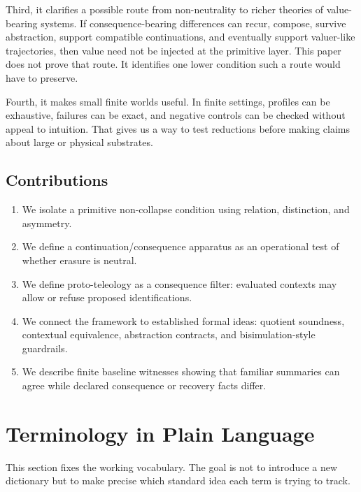 \documentclass[11pt]{article}
\begin{document}
Third, it clarifies a possible route from non-neutrality to richer theories of
value-bearing systems. If consequence-bearing differences can recur, compose,
survive abstraction, support compatible continuations, and eventually support
valuer-like trajectories, then value need not be injected at the primitive
layer. This paper does not prove that route. It identifies one lower condition
such a route would have to preserve.

Fourth, it makes small finite worlds useful. In finite settings, profiles can
be exhaustive, failures can be exact, and negative controls can be checked
without appeal to intuition. That gives us a way to test reductions before
making claims about large or physical substrates.

\subsection{Contributions}

\begin{enumerate}[leftmargin=*]
  \item We isolate a primitive non-collapse condition using relation,
  distinction, and asymmetry.

  \item We define a continuation/consequence apparatus as an operational test
  of whether erasure is neutral.

  \item We define proto-teleology as a consequence filter: evaluated contexts
  may allow or refuse proposed identifications.

  \item We connect the framework to established formal ideas: quotient
  soundness, contextual equivalence, abstraction contracts, and
  bisimulation-style guardrails.

  \item We describe finite baseline witnesses showing that familiar summaries
  can agree while declared consequence or recovery facts differ.
\end{enumerate}

\section{Terminology in Plain Language}

This section fixes the working vocabulary. The goal is not to introduce a new
dictionary but to make precise which standard idea each term is trying to
track.
\end{document}
